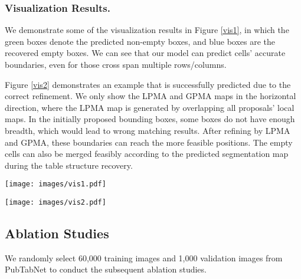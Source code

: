 \documentclass[runningheads]{llncs}
\begin{document}
\subsubsection{Visualization Results.}
We demonstrate some of the visualization results in Figure \ref{vis1}, in which the green boxes denote the predicted non-empty boxes, and blue boxes are the recovered empty boxes. We can see that our model can predict cells' accurate boundaries, even for those cross span multiple rows/columns.

Figure \ref{vis2} demonstrates an example that is successfully predicted due to the correct refinement. We only show the LPMA and GPMA maps in the horizontal direction, where the LPMA map is generated by overlapping all proposals' local maps. In the initially proposed bounding boxes, some boxes do not have enough breadth, which would lead to wrong matching results. After refining by LPMA and GPMA, these boundaries can reach the more feasible positions. The empty cells can also be merged feasibly according to the predicted segmentation map during the table structure recovery.

\begin{figure*}[t]
\begin{center}
\texttt{[image: images/vis1.pdf]}\\
\end{center}
\caption{Visualization results on ICDAR2013, SciTSR, PubTabNet. Green boxes are detected aligned bounding boxes, and blue boxes are empty cells generated by the proposed table structure recovery pipeline.}
\label{vis1}
\end{figure*}

\begin{figure*}[t]
\begin{center}
\texttt{[image: images/vis2.pdf]}\\
\end{center}
\caption{Visualization of an example that is successfully refined.  (a) The aligned bounding boxes before refinement. (b) LPMA (in horizontal). (c) GPMA (in horizontal). (d) Global binary segmentation. (e) Final result after refinement and empty cell merging.}
\label{vis2}
\end{figure*}
\subsection{Ablation Studies}
We randomly select 60,000 training images and 1,000 validation images from PubTabNet to conduct the subsequent ablation studies.
\end{document}
